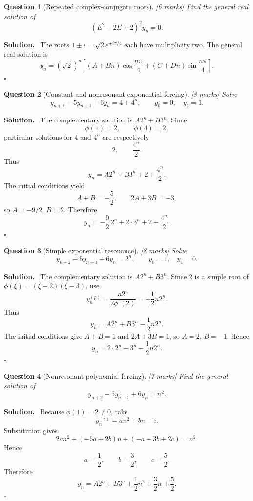 \documentclass[11pt,a4paper]{article}
\theoremstyle{questionstyle}
\newtheorem{question}{Question}
\newenvironment{solution}
  {\par\noindent\textbf{\color{solutiongreen}Solution.}\ }
  {\hfill$\square$\par}
\newcommand{\pointmark}[1]{\hfill\textnormal{\textit{[#1 marks]}}}
\begin{document}
\begin{question}[Repeated complex-conjugate roots]\pointmark{6}
Find the general real solution of
\[
  (E^2-2E+2)^2y_n=0.
\]
\end{question}

\begin{solution}
The roots \(1\pm i=\sqrt2e^{\pm i\pi/4}\) each have multiplicity two.
The general real solution is
\[
  \boxed{
  y_n=(\sqrt2)^n
  \left[
  (A+Bn)\cos\frac{n\pi}{4}
  +(C+Dn)\sin\frac{n\pi}{4}
  \right]}.
\]
\end{solution}

\begin{question}[Constant and nonresonant exponential forcing]\pointmark{8}
Solve
\[
  y_{n+2}-5y_{n+1}+6y_n=4+4^n,
  \qquad y_0=0,\quad y_1=1.
\]
\end{question}

\begin{solution}
The complementary solution is \(A2^n+B3^n\).  Since
\[
  \phi(1)=2,\qquad \phi(4)=2,
\]
particular solutions for \(4\) and \(4^n\) are respectively
\[
  2,\qquad \frac{4^n}{2}.
\]
Thus
\[
  y_n=A2^n+B3^n+2+\frac{4^n}{2}.
\]
The initial conditions yield
\[
  A+B=-\frac52,\qquad 2A+3B=-3,
\]
so \(A=-9/2\), \(B=2\).  Therefore
\[
  \boxed{
  y_n=-\frac92\,2^n+2\cdot3^n+2+\frac{4^n}{2}}.
\]
\end{solution}

\begin{question}[Simple exponential resonance]\pointmark{8}
Solve
\[
  y_{n+2}-5y_{n+1}+6y_n=2^n,
  \qquad y_0=1,\quad y_1=0.
\]
\end{question}

\begin{solution}
The complementary solution is \(A2^n+B3^n\).  Since \(2\) is a
simple root of \(\phi(\xi)=(\xi-2)(\xi-3)\), use
\[
  y_n^{(p)}
  =\frac{n2^n}{2\phi'(2)}
  =-\frac12n2^n.
\]
Thus
\[
  y_n=A2^n+B3^n-\frac12n2^n.
\]
The initial conditions give \(A+B=1\) and \(2A+3B=1\), so
\(A=2\), \(B=-1\).  Hence
\[
  \boxed{y_n=2\cdot2^n-3^n-\frac12n2^n}.
\]
\end{solution}

\begin{question}[Nonresonant polynomial forcing]\pointmark{7}
Find the general solution of
\[
  y_{n+2}-5y_{n+1}+6y_n=n^2.
\]
\end{question}

\begin{solution}
Because \(\phi(1)=2\neq0\), take
\[
  y_n^{(p)}=an^2+bn+c.
\]
Substitution gives
\[
  2an^2+(-6a+2b)n+(-a-3b+2c)=n^2.
\]
Hence
\[
  a=\frac12,\qquad b=\frac32,\qquad c=\frac52.
\]
Therefore
\[
  \boxed{
  y_n=A2^n+B3^n+\frac12n^2+\frac32n+\frac52}.
\]
\end{solution}
\end{document}
